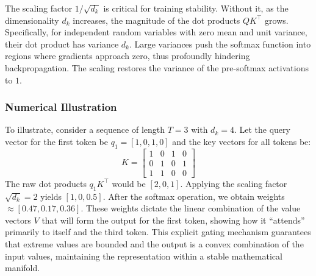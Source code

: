 \documentclass[11pt]{article}
\begin{document}
The scaling factor $1/\sqrt{d_k}$ is critical for training stability. Without it, as the dimensionality $d_k$ increases, the magnitude of the dot products $QK^\top$ grows. Specifically, for independent random variables with zero mean and unit variance, their dot product has variance $d_k$. Large variances push the softmax function into regions where gradients approach zero, thus profoundly hindering backpropagation. The scaling restores the variance of the pre-softmax activations to $1$.

\subsubsection{Numerical Illustration}
To illustrate, consider a sequence of length $T=3$ with $d_k=4$. Let the query vector for the first token be $q_1 = [1, 0, 1, 0]$ and the key vectors for all tokens be:
\begin{equation*}
    K = \begin{bmatrix} 1 & 0 & 1 & 0 \\ 0 & 1 & 0 & 1 \\ 1 & 1 & 0 & 0 \end{bmatrix}
\end{equation*}
The raw dot products $q_1 K^\top$ would be $[2, 0, 1]$. Applying the scaling factor $\sqrt{d_k}=2$ yields $[1, 0, 0.5]$. After the softmax operation, we obtain weights $\approx [0.47, 0.17, 0.36]$. These weights dictate the linear combination of the value vectors $V$ that will form the output for the first token, showing how it ``attends'' primarily to itself and the third token. This explicit gating mechanism guarantees that extreme values are bounded and the output is a convex combination of the input values, maintaining the representation within a stable mathematical manifold.
\end{document}
